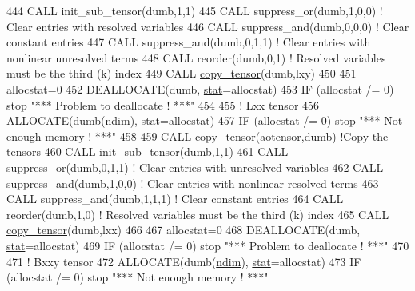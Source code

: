 \begin{DoxyCode}
444     \textcolor{keyword}{CALL }init\_sub\_tensor(dumb,1,1)
445     \textcolor{keyword}{CALL }suppress\_or(dumb,1,0,0) \textcolor{comment}{! Clear entries with resolved variables}
446     \textcolor{keyword}{CALL }suppress\_and(dumb,0,0,0) \textcolor{comment}{! Clear constant entries}
447     \textcolor{keyword}{CALL }suppress\_and(dumb,0,1,1) \textcolor{comment}{! Clear entries with nonlinear unresolved terms}
448     \textcolor{keyword}{CALL }reorder(dumb,0,1) \textcolor{comment}{! Resolved variables must be the third (k) index}
449     \textcolor{keyword}{CALL }\hyperlink{namespacetensor_a4a88ee8077278486c5128ad97617969e}{copy\_tensor}(dumb,lxy)
450 
451     allocstat=0
452     \textcolor{keyword}{DEALLOCATE}(dumb, \hyperlink{namespacestat}{stat}=allocstat)
453     \textcolor{keywordflow}{IF} (allocstat /= 0)  stop \textcolor{stringliteral}{"*** Problem to deallocate ! ***"}
454 
455     \textcolor{comment}{! Lxx tensor}
456     \textcolor{keyword}{ALLOCATE}(dumb(\hyperlink{namespaceparams_a2323fe1773f086e20c14f266351c482b}{ndim}), \hyperlink{namespacestat}{stat}=allocstat)
457     \textcolor{keywordflow}{IF} (allocstat /= 0) stop \textcolor{stringliteral}{"*** Not enough memory ! ***"}
458 
459     \textcolor{keyword}{CALL }\hyperlink{namespacetensor_a4a88ee8077278486c5128ad97617969e}{copy\_tensor}(\hyperlink{namespaceaotensor__def_a0dc43bc9294a18f2fe57b67489f1702f}{aotensor},dumb) \textcolor{comment}{!Copy the tensors}
460     \textcolor{keyword}{CALL }init\_sub\_tensor(dumb,1,1)
461     \textcolor{keyword}{CALL }suppress\_or(dumb,0,1,1) \textcolor{comment}{! Clear entries with unresolved variables}
462     \textcolor{keyword}{CALL }suppress\_and(dumb,1,0,0) \textcolor{comment}{! Clear entries with nonlinear resolved terms}
463     \textcolor{keyword}{CALL }suppress\_and(dumb,1,1,1) \textcolor{comment}{! Clear constant entries}
464     \textcolor{keyword}{CALL }reorder(dumb,1,0) \textcolor{comment}{! Resolved variables must be the third (k) index}
465     \textcolor{keyword}{CALL }\hyperlink{namespacetensor_a4a88ee8077278486c5128ad97617969e}{copy\_tensor}(dumb,lxx)
466 
467     allocstat=0
468     \textcolor{keyword}{DEALLOCATE}(dumb, \hyperlink{namespacestat}{stat}=allocstat)
469     \textcolor{keywordflow}{IF} (allocstat /= 0)  stop \textcolor{stringliteral}{"*** Problem to deallocate ! ***"}
470 
471     \textcolor{comment}{! Bxxy tensor}
472     \textcolor{keyword}{ALLOCATE}(dumb(\hyperlink{namespaceparams_a2323fe1773f086e20c14f266351c482b}{ndim}), \hyperlink{namespacestat}{stat}=allocstat)
473     \textcolor{keywordflow}{IF} (allocstat /= 0) stop \textcolor{stringliteral}{"*** Not enough memory ! ***"}

\end{DoxyCode}
